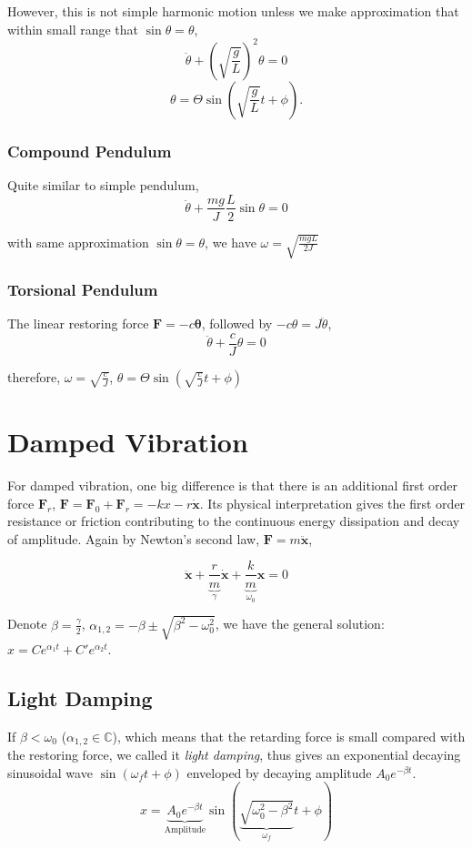 \documentclass[UTF8]{book}
\begin{document}
However, this is not simple harmonic motion unless we make approximation that within small range that $\sin \theta =\theta $,
\[\ddot{\theta }+\left(\sqrt{\frac{g}{L}}\right)^2\theta =0\]
\[\theta =\Theta \sin (\sqrt{\frac{g}{L}} t+\phi ).\]

\subsubsection{Compound Pendulum}
Quite similar to simple pendulum,
\[\ddot{\theta}+\frac{mg}{J}\frac{L}{2} \sin \theta=0\]

with same approximation $\sin \theta =\theta $, we have $\omega =\sqrt{\frac{mgL}{2J}}$
\subsubsection{Torsional Pendulum}
The linear restoring force $\mathbf{F}=-c\bm{\theta}$, followed by $-c\theta =J\ddot{\theta}$,
\[\ddot{\theta}+\frac{c}{J}\theta=0\]

therefore, $\omega =\sqrt{\frac{c}{J}}$, $\theta =\Theta \sin \left(\sqrt{\frac{c}{J}} t+\phi \right)$
\section{Damped Vibration}
For damped vibration, one big difference is that there is an additional first order force 
$\mathbf{F}_r$, $\mathbf{F}=\mathbf{F}_0+\mathbf{F}_r=-kx-r\dot{\mathbf{x}}$. Its physical interpretation 
gives the first order resistance or friction contributing to the continuous energy dissipation 
and decay of amplitude. Again by Newton's second law, $\mathbf{F}=m\ddot{\mathbf{x}}$,

\begin{equation}\label{eq:4}
\ddot{\mathbf{x}}+\underbrace{\frac{r}{m}}_{\gamma }\dot{\mathbf{x}}+\underbrace{\frac{k}{m}}_{\omega _0}\mathbf{x}=0
\end{equation}

Denote $\beta =\frac{\gamma}{2}$, $\alpha _{1,2}=-\beta \pm \sqrt{\beta ^2-\omega _0^2}$, we have the general solution: $x=Ce^{\alpha _1t}+C'e^{\alpha _2t}$.
\subsection{Light Damping}
If $\beta <\omega _0$ ($\alpha _{1,2}\in \mathbb{C}$), which means that the retarding force is small compared with the restoring force, we called it \emph{light damping}, thus gives an exponential decaying sinusoidal wave $\sin (\omega _ft+\phi )$ enveloped by decaying amplitude $A_0e^{-\beta t}$.
\[x=\underbrace{A_0e^{-\beta t}}_\text{Amplitude}\sin (\underbrace{\sqrt{\omega _0^2-\beta ^2}}_{\omega _f} t+\phi )\]
\end{document}
